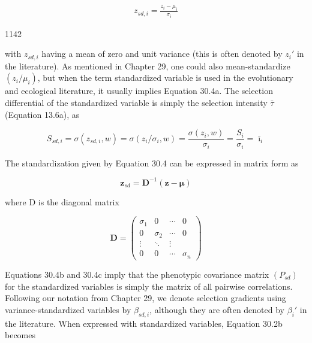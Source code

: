 \documentclass{article}
\begin{document}
\begin{equation}
\begin{align*}z_{sd,i}=\frac{z_i-\mu_i}{\sigma_i}\end{align*}
\tag{30.4a}
\label{eq:30_4a}
\end{equation}

1142

with  $ z_{sd,i} $ having a mean of zero and unit variance (this is often denoted by  $ z_i' $ in the literature). As mentioned in Chapter 29, one could also mean-standardize  $ (z_i/\mu_i) $, but when the term standardized variable is used in the evolutionary and ecological literature, it usually implies Equation 30.4a. The selection differential of the standardized variable is simply the selection intensity  $ \bar{\tau} $ (Equation 13.6a), as

\begin{equation}
S_{sd,i}=\sigma(z_{sd,i},w)=\sigma(z_{i}/\sigma_{i},w)=\frac{\sigma(z_{i},w)}{\sigma_{i}}=\frac{S_{i}}{\sigma_{i}}=\bar{\imath}_{i}
\end{equation}

The standardization given by Equation 30.4 can be expressed in matrix form as

\begin{equation}
\mathbf{z}_{sd}=\mathbf{D}^{-1}(\mathbf{z}-\boldsymbol{\mu})
\tag{30.4b}
\label{eq:30_4b}
\end{equation}

where D is the diagonal matrix

\begin{equation}
\mathbf{D}=\begin{pmatrix}{{{\sigma_{1}}}}&{{{0}}}&{{{\cdots}}}&{{{0}}} \\{{{0}}}&{{{\sigma_{2}}}}&{{{\cdots}}}&{{{0}}} \\{{{\vdots}}}&{{{\ddots}}}&{{{\vdots}}} \\{{{0}}}&{{{0}}}&{{{\cdots}}}&{{{\sigma_{n}}}}\end{pmatrix}
\tag{30.4c}
\label{eq:30_4c}
\end{equation}

Equations 30.4b and 30.4c imply that the phenotypic covariance matrix  $ (P_{sd}) $ for the standardized variables is simply the matrix of all pairwise correlations. Following our notation from Chapter 29, we denote selection gradients using variance-standardized variables by  $ \beta_{sd,i} $, although they are often denoted by  $ \beta_i' $ in the literature. When expressed with standardized variables, Equation 30.2b becomes
\end{document}
